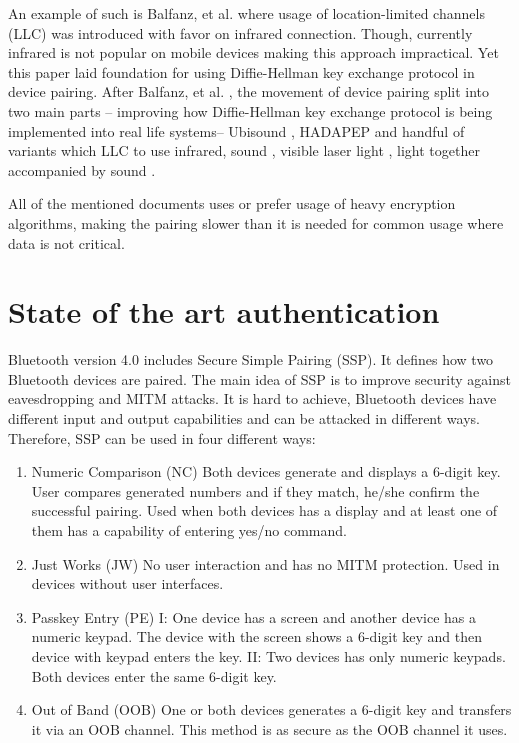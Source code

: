 \documentclass[12pt]{article}
\begin{document}
An example of such is Balfanz, et al. \cite {talkingto} where usage of location-limited channels (LLC) was introduced with favor on infrared connection. Though, currently infrared is not popular on mobile devices  making this approach impractical. Yet this paper laid foundation for using Diffie-Hellman key exchange protocol in device pairing. After Balfanz, et al. \cite {talkingto}, the movement of device pairing split into two main parts – improving how Diffie-Hellman key exchange protocol is being implemented into real life systems– Ubisound \cite {ubisound}, HADAPEP \cite {hadapep} and handful of variants which LLC to use infrared, sound \cite {talkingto}, visible laser light \cite {laserlight}, light together accompanied by sound \cite {beeplight}.

All of the mentioned documents uses or prefer usage of heavy encryption algorithms, making the pairing slower than it is needed for common usage where data is not critical.

\section{State of the art authentication}
\label{sec:State of the art authentication}

Bluetooth version 4.0 includes Secure Simple Pairing (SSP). It defines how two Bluetooth devices are paired. The main idea of SSP is to improve security against eavesdropping and MITM attacks. It is hard to achieve, Bluetooth devices have different input and output capabilities and can be attacked in different ways. Therefore, SSP can be used in four different ways:
\begin{enumerate}
	\item Numeric Comparison (NC)
	Both devices generate and displays a 6-digit key. User compares generated numbers and if they match, he/she confirm the successful pairing. Used when both devices has a display and at least one of them has a capability of entering yes/no command.
	\item Just Works (JW)
	No user interaction and has no MITM protection. Used in devices without user interfaces.

	\item Passkey Entry (PE)
    I: One device has a screen and another device has a numeric keypad. The device with the screen shows a 6-digit key and then device with keypad enters the key.
	II: Two devices has only numeric keypads. Both devices enter the same 6-digit key.

	\item Out of Band (OOB)
    One or both devices generates a 6-digit key and transfers it via an OOB channel. This method is as secure as the OOB channel it uses.
\end{enumerate}
\end{document}
